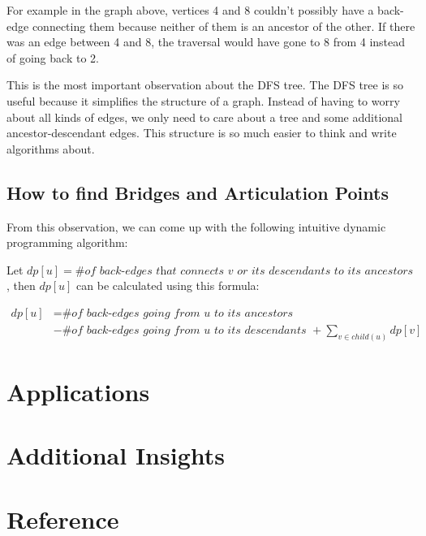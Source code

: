 \documentclass{article}
\begin{document}
For example in the graph above, vertices 4 and 8 couldn't possibly have a back-edge connecting them because neither of them is an ancestor of the other. If there was an edge between 4 and 8, the traversal would have gone to 8 from 4 instead of going back to 2.

This is the most important observation about the DFS tree. The DFS tree is so useful because it simplifies the structure of a graph. Instead of having to worry about all kinds of edges, we only need to care about a tree and some additional ancestor-descendant edges. This structure is so much easier to think and write algorithms about.

\subsection{How to find Bridges and Articulation Points}

From this observation, we can come up with the following intuitive dynamic programming algorithm:

Let $dp[u] = \# \textit{of back-edges that connects $v$ or its descendants to its ancestors}$, then $dp[u]$ can be calculated using this formula:

\begin{align*}
    dp[u] &= \textit{\# of back-edges going from u to its ancestors }\\
            &- \textit{\# of back-edges going from u to its descendants } + \sum_{v \in child(u)} dp[v] 
\end{align*}
    

\section{Applications}

\section{Additional Insights}

\section{Reference}
\end{document}
